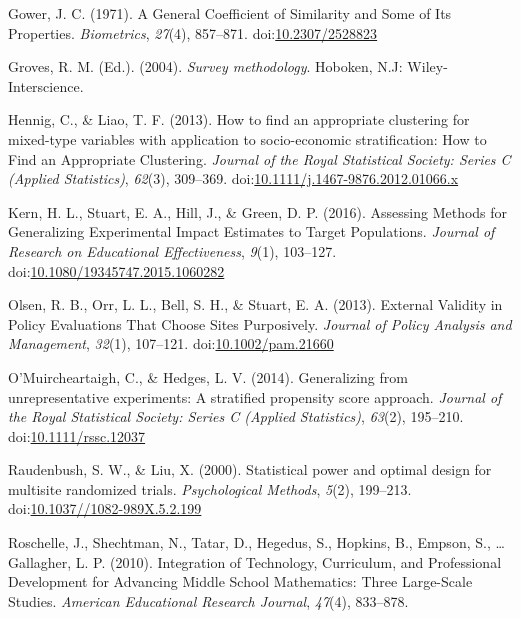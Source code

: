 \documentclass[man,floatsintext]{apa6}
\begin{document}
\leavevmode\hypertarget{ref-gowerGeneralCoefficientSimilarity1971}{}%
Gower, J. C. (1971). A General Coefficient of Similarity and Some of Its Properties. \emph{Biometrics}, \emph{27}(4), 857--871. doi:\href{https://doi.org/10.2307/2528823}{10.2307/2528823}

\leavevmode\hypertarget{ref-grovesSurveyMethodology2004}{}%
Groves, R. M. (Ed.). (2004). \emph{Survey methodology}. Hoboken, N.J: Wiley-Interscience.

\leavevmode\hypertarget{ref-hennigHowFindAppropriate2013}{}%
Hennig, C., \& Liao, T. F. (2013). How to find an appropriate clustering for mixed-type variables with application to socio-economic stratification: How to Find an Appropriate Clustering. \emph{Journal of the Royal Statistical Society: Series C (Applied Statistics)}, \emph{62}(3), 309--369. doi:\href{https://doi.org/10.1111/j.1467-9876.2012.01066.x}{10.1111/j.1467-9876.2012.01066.x}

\leavevmode\hypertarget{ref-kernAssessingMethodsGeneralizing2016}{}%
Kern, H. L., Stuart, E. A., Hill, J., \& Green, D. P. (2016). Assessing Methods for Generalizing Experimental Impact Estimates to Target Populations. \emph{Journal of Research on Educational Effectiveness}, \emph{9}(1), 103--127. doi:\href{https://doi.org/10.1080/19345747.2015.1060282}{10.1080/19345747.2015.1060282}

\leavevmode\hypertarget{ref-olsenExternalValidityPolicy2013}{}%
Olsen, R. B., Orr, L. L., Bell, S. H., \& Stuart, E. A. (2013). External Validity in Policy Evaluations That Choose Sites Purposively. \emph{Journal of Policy Analysis and Management}, \emph{32}(1), 107--121. doi:\href{https://doi.org/10.1002/pam.21660}{10.1002/pam.21660}

\leavevmode\hypertarget{ref-omuircheartaighGeneralizingUnrepresentativeExperiments2014}{}%
O'Muircheartaigh, C., \& Hedges, L. V. (2014). Generalizing from unrepresentative experiments: A stratified propensity score approach. \emph{Journal of the Royal Statistical Society: Series C (Applied Statistics)}, \emph{63}(2), 195--210. doi:\href{https://doi.org/10.1111/rssc.12037}{10.1111/rssc.12037}

\leavevmode\hypertarget{ref-raudenbushStatisticalPowerOptimal2000}{}%
Raudenbush, S. W., \& Liu, X. (2000). Statistical power and optimal design for multisite randomized trials. \emph{Psychological Methods}, \emph{5}(2), 199--213. doi:\href{https://doi.org/10.1037//1082-989X.5.2.199}{10.1037//1082-989X.5.2.199}

\leavevmode\hypertarget{ref-roschelleIntegrationTechnologyCurriculum2010}{}%
Roschelle, J., Shechtman, N., Tatar, D., Hegedus, S., Hopkins, B., Empson, S., \ldots{} Gallagher, L. P. (2010). Integration of Technology, Curriculum, and Professional Development for Advancing Middle School Mathematics: Three Large-Scale Studies. \emph{American Educational Research Journal}, \emph{47}(4), 833--878.
\end{document}
